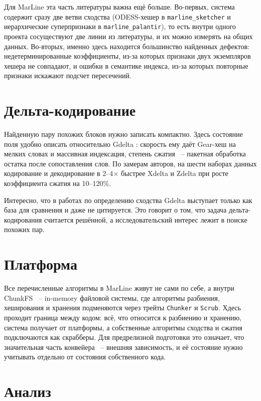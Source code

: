 \documentclass[a4paper]{article}
\begin{document}
Для MarLine эта часть литературы важна ещё больше. Во-первых, система содержит
сразу две ветви сходства (ODESS-хешер в \texttt{marline\_sketcher} и
иерархические суперпризнаки в \texttt{marline\_palantir}), то есть внутри
одного проекта сосуществуют две линии из литературы, и их можно измерять на
общих данных. Во-вторых, именно здесь находится большинство найденных
дефектов: недетерминированные коэффициенты, из-за которых признаки двух
экземпляров хешера не совпадают, и ошибки в семантике индекса, из-за которых
повторные признаки искажают подсчет пересечений.

\section{Дельта-кодирование}

Найденную пару похожих блоков нужно записать компактно. Здесь состояние поля
удобно описать относительно Gdelta \cite{gdelta2020}: скорость ему даёт
Gear-хеш на мелких словах и массивная индексация, степень сжатия ~-- пакетная
обработка остатка после сопоставления слов. По замерам авторов, на шести
наборах данных кодирование и декодирование в 2--4$\times$ быстрее Xdelta и
Zdelta при росте коэффициента сжатия на 10--120\%.

Интересно, что в работах по определению сходства
\cite{odess2021,palantir2024,speedsketch2025} Gdelta выступает только как
база для сравнения и даже не цитируется. Это говорит о том, что задача
дельта-кодирования считается решённой, а исследовательский интерес лежит в
поиске похожих пар.

\section{Платформа}

Все перечисленные алгоритмы в MarLine живут не сами по себе, а внутри ChunkFS
\cite{chunkfs} ~-- in-memory файловой системы, где алгоритмы разбиения,
хеширования и хранения подменяются через трейты \texttt{Chunker} и
\texttt{Scrub}. Хдесь проходит граница между кодом:
всё, что относится к разбиению и хранению, система получает от платформы, а
собственные алгоритмы сходства и сжатия подключаются как скрабберы. Для
предрелизной подготовки это означает, что значительная часть конвейера ~--
внешняя зависимость, и её состояние нужно учитывать отдельно от состояния
собственного кода.

\section{Анализ}
\end{document}
